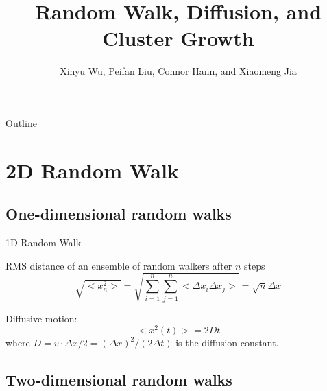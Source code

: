 \documentclass{beamer}
\title{Random Walk, Diffusion, and Cluster Growth}
\author{Xinyu Wu, Peifan Liu, Connor Hann, and Xiaomeng Jia}
\institute[] {Physics Department, Duke University}
\begin{document}
\begin{frame}
  \titlepage
\end{frame}

\begin{frame}{Outline}
  \tableofcontents
\end{frame}


\section{2D Random Walk}


\subsection{One-dimensional random walks}

\begin{frame}{1D Random Walk}

RMS distance of an ensemble of random walkers after $n$ steps
\begin{equation}
	\sqrt{<x_n^2>} = \sqrt{\sum\limits_{i=1}^{n}\sum\limits_{j=1}^{n}<\Delta x_i\Delta x_j>} = \sqrt{n}\Delta x
\end{equation} 

Diffusive motion:
\begin{equation}
	<x^2(t)> = 2Dt
\end{equation}
where $D = v\cdot\Delta x/2 = (\Delta x)^2/(2\Delta t)$ is the diffusion constant.

\end{frame}

\subsection{Two-dimensional random walks}
\end{document}

